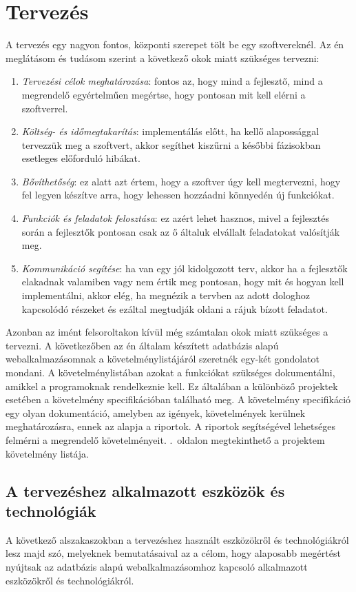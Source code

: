 \documentclass[]{thesis-ekf}
\theoremstyle{definition}
\theoremstyle{remark}
\begin{document}
	\chapter{Tervezés}
		A tervezés egy nagyon fontos, központi szerepet tölt be egy szoftvereknél. Az én meglátásom és tudásom szerint a következő okok miatt szükséges tervezni:
		\begin{enumerate}
			\item \emph{Tervezési célok meghatározása}: fontos az, hogy mind a fejlesztő, mind a megrendelő egyértelműen megértse, hogy pontosan mit kell elérni a szoftverrel.
			\item \emph{Költség- és időmegtakarítás}: implementálás előtt, ha kellő alapossággal tervezzük meg a szoftvert, akkor segíthet kiszűrni a későbbi fázisokban esetleges előforduló hibákat. 
			\item \emph{Bővíthetőség}: ez alatt azt értem, hogy a szoftver úgy kell megtervezni, hogy fel legyen készítve arra, hogy lehessen hozzáadni könnyedén új funkciókat.
			\item \emph{Funkciók és feladatok felosztása}: ez azért lehet hasznos, mivel a fejlesztés során a fejlesztők pontosan csak az ő általuk elvállalt feladatokat valósítják meg.
			\item \emph{Kommunikáció segítése}: ha van egy jól kidolgozott terv, akkor ha a fejlesztők elakadnak valamiben vagy nem értik meg pontosan, hogy mit és hogyan kell implementálni, akkor elég, ha megnézik a tervben az adott dologhoz kapcsolódó részeket és ezáltal megtudják oldani a rájuk bízott feladatot.
		\end{enumerate}
		Azonban az imént felsoroltakon kívül még számtalan okok miatt szükséges a tervezni. A következőben az én általam készített adatbázis alapú webalkalmazásomnak a követelménylistájáról szeretnék egy-két gondolatot mondani. A követelménylistában azokat a funkciókat szükséges dokumentálni, amikkel a programoknak rendelkeznie kell. Ez általában a különböző projektek esetében a követelmény specifikációban található meg. A követelmény specifikáció egy olyan dokumentáció, amelyben az igények, követelmények kerülnek meghatározásra, ennek az alapja a riportok. A riportok segítségével lehetséges felmérni a megrendelő követelményeit. \Az{\pageref{kovetelmenylista}}.~oldalon megtekinthető a projektem követelmény listája.
		
	\section{A tervezéshez alkalmazott eszközök és technológiák}
		A következő alszakaszokban a tervezéshez használt eszközökről és technológiákról lesz majd szó, melyeknek bemutatásaival az a célom, hogy alaposabb megértést nyújtsak az adatbázis alapú webalkalmazásomhoz kapcsoló alkalmazott eszközökről és technológiákról.
\end{document}
